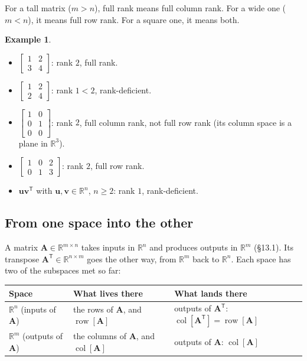 \documentclass[11pt]{article}
\theoremstyle{plain}
\theoremstyle{definition}
\newtheorem{ex}{Example}[section]
\theoremstyle{remark}
\newcommand{\R}{\mathbb{R}}
\newcommand{\vc}[1]{\mathbf{#1}}
\newcommand{\mt}[1]{\mathbf{#1}}
\newcommand{\T}{^{\mathsf{T}}}
\newcommand{\colsp}[1]{\operatorname{col}[#1]}
\newcommand{\rowsp}[1]{\operatorname{row}[#1]}
\begin{document}
\noindent For a tall matrix ($m>n$), full rank means full column rank. For a
wide one ($m<n$), it means full row rank. For a square one, it means both.

\begin{ex}
\leavevmode
\begin{itemize}[leftmargin=1.4em,itemsep=2pt]
  \item $\begin{bmatrix}1&2\\3&4\end{bmatrix}$: rank $2$, full rank.
  \item $\begin{bmatrix}1&2\\2&4\end{bmatrix}$: rank $1<2$, rank-deficient.
  \item $\begin{bmatrix}1&0\\0&1\\0&0\end{bmatrix}$: rank $2$, full column rank,
        not full row rank (its column space is a plane in $\R^{3}$).
  \item $\begin{bmatrix}1&0&2\\0&1&3\end{bmatrix}$: rank $2$, full row rank.
  \item $\vc{u}\vc{v}\T$ with $\vc{u},\vc{v}\in\R^{n}$, $n\ge2$: rank $1$,
        rank-deficient.
\end{itemize}
\end{ex}

\subsection{From one space into the other}
A matrix $\mt{A}\in\R^{m\times n}$ takes inputs in $\R^{n}$ and produces outputs
in $\R^{m}$ (\S13.1). Its transpose $\mt{A}\T\in\R^{n\times m}$ goes the other
way, from $\R^{m}$ back to $\R^{n}$. Each space has two of the subspaces met so
far:
\begin{center}
\renewcommand{\arraystretch}{1.35}
\begin{tabular}{@{}l l l@{}}
\toprule
\textbf{Space} & \textbf{What lives there} & \textbf{What lands there} \\
\midrule
$\R^{n}$ (inputs of $\mt{A}$) & the rows of $\mt{A}$, and $\rowsp{\mt{A}}$ & outputs of $\mt{A}\T$: $\colsp{\mt{A}\T}=\rowsp{\mt{A}}$ \\
$\R^{m}$ (outputs of $\mt{A}$) & the columns of $\mt{A}$, and $\colsp{\mt{A}}$ & outputs of $\mt{A}$: $\colsp{\mt{A}}$ \\
\bottomrule
\end{tabular}
\end{center}
\end{document}
